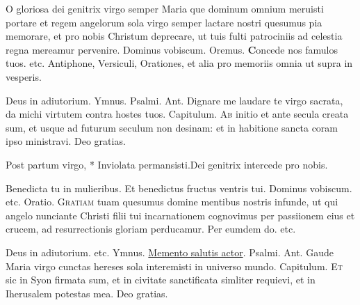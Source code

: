 \begin{multicols*}{2}
 O gloriosa dei genitrix virgo semper Maria que dominum omnium meruisti portare et regem angelorum sola virgo semper lactare nostri quesumus pia memorare, et pro nobis Christum deprecare, ut tuis fulti patrociniis ad celestia regna mereamur pervenire. Dominus vobiscum. Oremus.
{\bfseries \color{Red} C}{oncede} nos famulos tuos. etc.
{\color{Red} Antiphone, Versiculi, Orationes, et alia pro memoriis omnia ut supra in vesperis.}
{\color{Red} }
\par \noindent Deus in adiutorium. {\color{Red} Ymnus.}
{\color{Red} Psalmi.}
{\color{Red} Ant.} Dignare me laudare te virgo sacrata, da michi virtutem contra hostes tuos. {\color{Red} Capitulum.}
\lettrine[lines=2]{\zallmancaps \color{Blue} A}{b} initio et ante secula creata sum, et usque ad futurum seculum non desinam: et in habitione sancta coram ipso ministravi. Deo gratias.
\begin{responsory-breve}
{Post partum virgo, * Inviolata permansisti.}{Dei genitrix intercede pro nobis.}
\end{responsory-breve}
\V Benedicta tu in mulieribus. \R Et benedictus fructus ventris tui. Dominus vobiscum. etc. {\color{Red} Oratio.}
\lettrine[lines=2]{\zallmancaps \color{Red} G}{ratiam} tuam quesumus domine mentibus nostris infunde, ut qui angelo nunciante Christi filii tui incarnationem cognovimus per passiionem eius et crucem, ad resurrectionis gloriam perducamur. Per eumdem do. etc.
{\color{Red} }
\par \noindent Deus in adiutorium. etc. {\color{Red} Ymnus.} \hyperlink{memento-salutis}{Memento salutis actor}. {\color{Red} Psalmi.}
{\color{Red} Ant.} Gaude Maria virgo cunctas hereses sola interemisti in universo mundo. {\color{Red} Capitulum.}
\lettrine[lines=2]{\zallmancaps \color{Blue} E}{t} sic in Syon firmata sum, et in civitate sanctificata simliter requievi, et in Iherusalem potestas mea. Deo gratias.

\end{multicols*}
